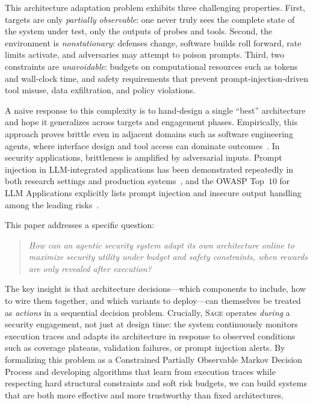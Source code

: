 \documentclass[sigconf,anonymous]{acmart}
\newcommand{\SAGE}{\textsc{Sage}\xspace}
\begin{document}
This architecture adaptation problem exhibits three challenging properties. First, targets are only \emph{partially observable}: one never truly sees the complete state of the system under test, only the outputs of probes and tools. Second, the environment is \emph{nonstationary}: defenses change, software builds roll forward, rate limits activate, and adversaries may attempt to poison prompts. Third, two constraints are \emph{unavoidable}: budgets on computational resources such as tokens and wall-clock time, and safety requirements that prevent prompt-injection-driven tool misuse, data exfiltration, and policy violations.

A naive response to this complexity is to hand-design a single ``best'' architecture and hope it generalizes across targets and engagement phases. Empirically, this approach proves brittle even in adjacent domains such as software engineering agents, where interface design and tool access can dominate outcomes~\cite{yang2024sweagent}. In security applications, brittleness is amplified by adversarial inputs. Prompt injection in LLM-integrated applications has been demonstrated repeatedly in both research settings and production systems~\cite{liu2024promptinjection,greshake2023indirect}, and the OWASP Top~$10$ for LLM Applications explicitly lists prompt injection and insecure output handling among the leading risks~\cite{owasp2023llmtop10}.

This paper addresses a specific question:
\begin{quote}
\emph{How can an agentic security system adapt its own architecture online to maximize security utility under budget and safety constraints, when rewards are only revealed after execution?}
\end{quote}

The key insight is that architecture decisions---which components to include, how to wire them together, and which variants to deploy---can themselves be treated as \emph{actions} in a sequential decision problem. Crucially, \SAGE operates \emph{during} a security engagement, not just at design time: the system continuously monitors execution traces and adapts its architecture in response to observed conditions such as coverage plateaus, validation failures, or prompt injection alerts. By formalizing this problem as a Constrained Partially Observable Markov Decision Process and developing algorithms that learn from execution traces while respecting hard structural constraints and soft risk budgets, we can build systems that are both more effective and more trustworthy than fixed architectures.
\end{document}
